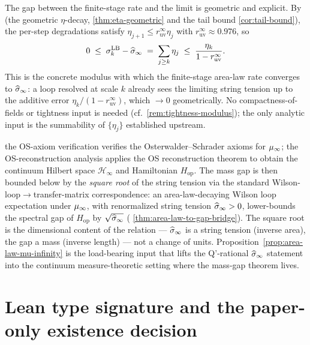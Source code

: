 \begin{remark}
\label{rem:sigma-injection-rate}
The gap between the finite-stage rate and the limit is geometric and
explicit.  By  (the geometric $\eta$-decay,
\cref{thm:eta-geometric} and the tail bound \cref{cor:tail-bound}),
the per-step degradations satisfy $\eta_{j+1} \le r_{\mathrm{uv}}^\infty
\eta_j$ with $r_{\mathrm{uv}}^\infty \approx 0.976$, so
\begin{equation*}
  0 \;\le\; \sigma^{\mathrm{LB}}_k - \widehat{\sigma}_\infty
  \;=\; \sum_{j \ge k} \eta_j
  \;\le\; \frac{\eta_k}{1 - r_{\mathrm{uv}}^\infty}.
\end{equation*}
This is the concrete modulus with which the finite-stage area-law rate
converges to $\widehat{\sigma}_\infty$: a loop resolved at scale $k$ already sees the
limiting string tension up to the additive error
$\eta_k/(1 - r_{\mathrm{uv}}^\infty)$, which $\to 0$ geometrically.  No
compactness-of-fields or tightness input is needed (cf.\
\cref{rem:tightness-modulus}); the only analytic input is the
summability of $\{\eta_j\}$ established upstream.
\end{remark}

\begin{remark}
\label{rem:bridge-mass-gap}
the OS-axiom verification verifies the Osterwalder--Schrader axioms for $\mu_\infty$;
the OS-reconstruction analysis applies the OS reconstruction theorem to obtain the
continuum Hilbert space $\mathcal{H}_\infty$ and Hamiltonian
$H_{\mathrm{op}}$.  The mass gap is then bounded below by the
\emph{square root} of the string tension via the standard
Wilson-loop$\to$transfer-matrix correspondence: an
area-law-decaying Wilson loop expectation under $\mu_\infty$, with
renormalized string tension $\widehat{\sigma}_\infty > 0$, lower-bounds the spectral
gap of $H_{\mathrm{op}}$ by $\sqrt{\widehat{\sigma}_\infty}$
( \cref{thm:area-law-to-gap-bridge}).  The
square root is the dimensional content of the relation --- $\widehat{\sigma}_\infty$
is a string tension (inverse area), the gap a mass (inverse length) ---
not a change of units.
Proposition~\ref{prop:area-law-mu-infinity} is the load-bearing
input that lifts the Q'-rational $\widehat{\sigma}_\infty$ statement into the
continuum measure-theoretic setting where the mass-gap theorem
lives.
\end{remark}

\section{Lean type signature and the paper-only existence decision}
\label{sec:lean-signature}


